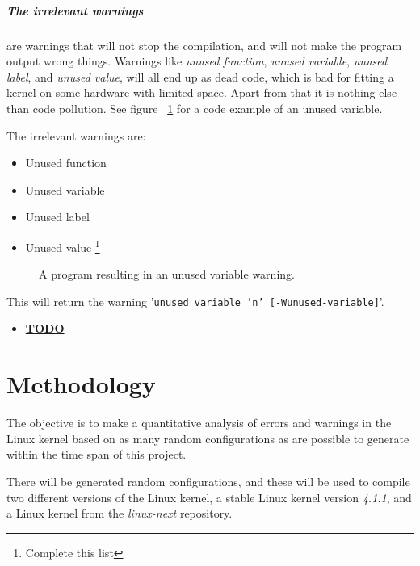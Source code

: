 \documentclass[a4paper,11pt]{report}
\newcommand{\figa}{
    \begin{figure}[!htpb]
    \centering
}
\newcommand{\figb}[2]{
    \caption{#1}
    \label{#2}
    \end{figure}
}
\begin{document}
    \paragraph{The irrelevant warnings}
are warnings that will not stop the compilation, and will not make the program 
output wrong things. Warnings like \emph{unused function}, \emph{unused 
variable}, \emph{unused label}, and \emph{unused value}, will all end up as 
dead code, which is bad for fitting a kernel on some hardware with limited 
space. Apart from that it is nothing else than code pollution. See figure 
~\ref{lst:unusedvar} for a code example  of an unused variable.

The irrelevant warnings are:

\begin{itemize}
    \item Unused function
    \item Unused variable
    \item Unused label
    \item Unused value
        \footnote{Complete this list}
\end{itemize}

\figa
    
\figb{A program resulting in an unused variable warning.}{lst:unusedvar}

This will return the warning '\texttt{unused variable 'n' [-Wunused-variable]}'.

\begin{itemize}
    \item \underline{\textbf{TODO}}
\end{itemize}


\newpage
\chapter{Methodology}

The objective is to make a quantitative analysis of errors and warnings in the 
Linux kernel based on as many random configurations as are possible to generate 
within the time span of this project.

There will be generated random configurations, and these will be used to 
compile two different versions of the Linux kernel, a stable Linux kernel 
version \emph{4.1.1}, and a Linux kernel from the \emph{linux-next} repository.
\end{document}
